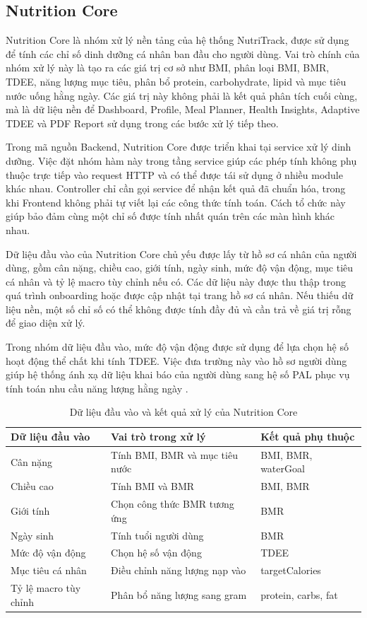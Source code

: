\documentclass[12pt, a4paper]{report}
\begin{document}
\subsection{Nutrition Core}Nutrition Core là nhóm xử lý nền tảng của hệ thống NutriTrack, được sử dụng để tính các chỉ số dinh dưỡng cá nhân ban đầu cho người dùng. Vai trò chính của nhóm xử lý này là tạo ra các giá trị cơ sở như BMI, phân loại BMI, BMR, TDEE, năng lượng mục tiêu, phân bổ protein, carbohydrate, lipid và mục tiêu nước uống hằng ngày. Các giá trị này không phải là kết quả phân tích cuối cùng, mà là dữ liệu nền để Dashboard, Profile, Meal Planner, Health Insights, Adaptive TDEE và PDF Report sử dụng trong các bước xử lý tiếp theo.

Trong mã nguồn Backend, Nutrition Core được triển khai tại service xử lý dinh dưỡng. Việc đặt nhóm hàm này trong tầng service giúp các phép tính không phụ thuộc trực tiếp vào request HTTP và có thể được tái sử dụng ở nhiều module khác nhau. Controller chỉ cần gọi service để nhận kết quả đã chuẩn hóa, trong khi Frontend không phải tự viết lại các công thức tính toán. Cách tổ chức này giúp bảo đảm cùng một chỉ số được tính nhất quán trên các màn hình khác nhau.

Dữ liệu đầu vào của Nutrition Core chủ yếu được lấy từ hồ sơ cá nhân của người dùng, gồm cân nặng, chiều cao, giới tính, ngày sinh, mức độ vận động, mục tiêu cá nhân và tỷ lệ macro tùy chỉnh nếu có. Các dữ liệu này được thu thập trong quá trình onboarding hoặc được cập nhật tại trang hồ sơ cá nhân. Nếu thiếu dữ liệu nền, một số chỉ số có thể không được tính đầy đủ và cần trả về giá trị rỗng để giao diện xử lý.

Trong nhóm dữ liệu đầu vào, mức độ vận động được sử dụng để lựa chọn hệ số hoạt động thể chất khi tính TDEE. Việc đưa trường này vào hồ sơ người dùng giúp hệ thống ánh xạ dữ liệu khai báo của người dùng sang hệ số PAL phục vụ tính toán nhu cầu năng lượng hằng ngày \cite{fao_who_unu_2001}.

\begin{table}[htbp]
\centering
\caption{Dữ liệu đầu vào và kết quả xử lý của Nutrition Core}
\begin{tabular}{|p{4cm}|p{4cm}|p{7cm}|}
\hline
\textbf{Dữ liệu đầu vào} & \textbf{Vai trò trong xử lý} & \textbf{Kết quả phụ thuộc} \\
\hline
Cân nặng & Tính BMI, BMR và mục tiêu nước & BMI, BMR, waterGoal \\
\hline
Chiều cao & Tính BMI và BMR & BMI, BMR \\
\hline
Giới tính & Chọn công thức BMR tương ứng & BMR \\
\hline
Ngày sinh & Tính tuổi người dùng & BMR \\
\hline
Mức độ vận động & Chọn hệ số vận động & TDEE \\
\hline
Mục tiêu cá nhân & Điều chỉnh năng lượng nạp vào & targetCalories \\
\hline
Tỷ lệ macro tùy chỉnh & Phân bổ năng lượng sang gram & protein, carbs, fat \\
\hline
\end{tabular}
\end{table}
\end{document}
